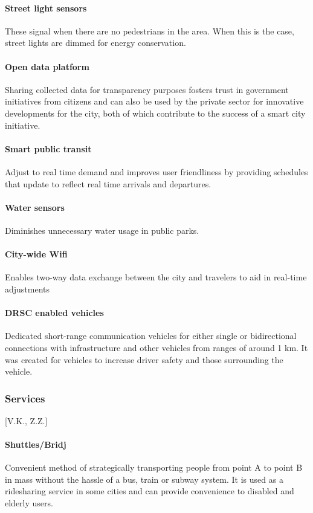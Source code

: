 \documentclass[12pt]{article}                       %
\begin{document}
\paragraph{Street light sensors} These signal when there are no pedestrians in the area. When this is the case, street lights are dimmed for energy conservation.

\paragraph{Open data platform} Sharing collected data for transparency purposes fosters trust in government initiatives from citizens and can also be used by the private sector for innovative developments for the city, both of which contribute to the success of a smart city initiative.

\paragraph{Smart public transit} Adjust to real time demand and improves user friendliness by providing schedules that update to reflect real time arrivals and departures. 

\paragraph{Water sensors} Diminishes unnecessary water usage in public parks.

\paragraph{City-wide Wifi} Enables two-way data exchange between the city and travelers to aid in real-time adjustments

\paragraph{DRSC enabled vehicles} Dedicated short-range communication vehicles for either single or bidirectional connections with infrastructure and other vehicles from ranges of around 1 km. It was created for vehicles to increase driver safety and those surrounding the vehicle.

\subsubsection{Services}[V.K., Z.Z.]
\paragraph{Shuttles/Bridj} Convenient method of strategically transporting people from point A to point B in mass without the hassle of a bus, train or subway system. It is used as a ridesharing service in some cities and can provide convenience to disabled and elderly users.
\end{document}
